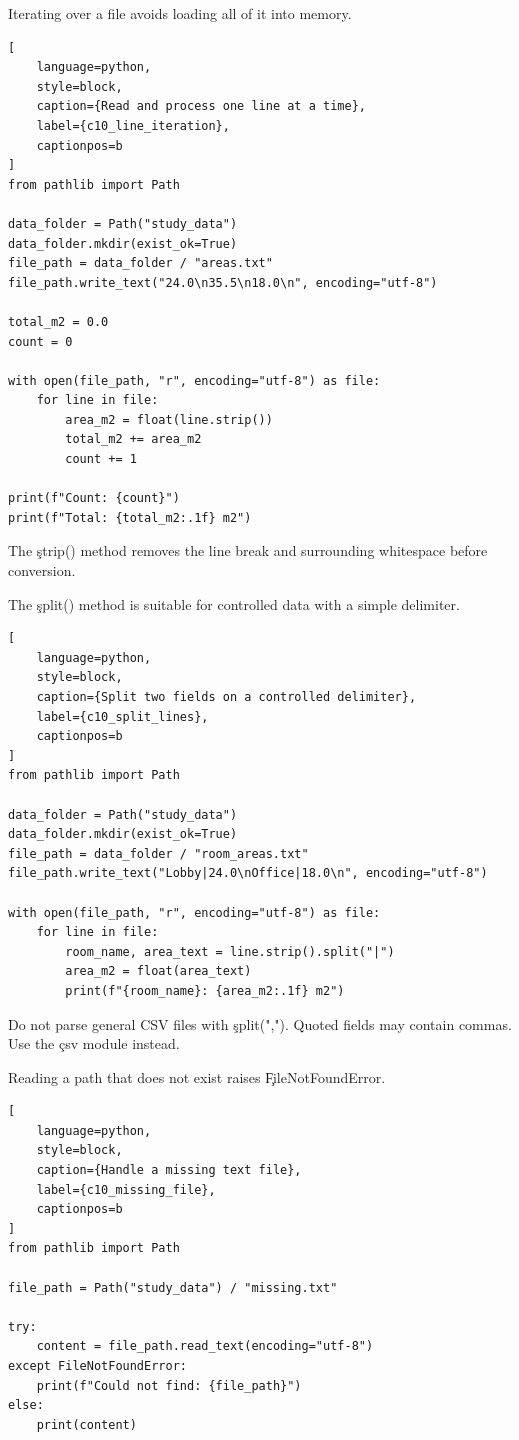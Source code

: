
Iterating over a file avoids loading all of it into memory.

\begin{lstlisting}[
    language=python,
    style=block,
    caption={Read and process one line at a time},
    label={c10_line_iteration},
    captionpos=b
]
from pathlib import Path

data_folder = Path("study_data")
data_folder.mkdir(exist_ok=True)
file_path = data_folder / "areas.txt"
file_path.write_text("24.0\n35.5\n18.0\n", encoding="utf-8")

total_m2 = 0.0
count = 0

with open(file_path, "r", encoding="utf-8") as file:
    for line in file:
        area_m2 = float(line.strip())
        total_m2 += area_m2
        count += 1

print(f"Count: {count}")
print(f"Total: {total_m2:.1f} m2")
\end{lstlisting}

The \c{strip()} method removes the line break and surrounding whitespace before
conversion.


The \c{split()} method is suitable for controlled data with a simple delimiter.

\begin{lstlisting}[
    language=python,
    style=block,
    caption={Split two fields on a controlled delimiter},
    label={c10_split_lines},
    captionpos=b
]
from pathlib import Path

data_folder = Path("study_data")
data_folder.mkdir(exist_ok=True)
file_path = data_folder / "room_areas.txt"
file_path.write_text("Lobby|24.0\nOffice|18.0\n", encoding="utf-8")

with open(file_path, "r", encoding="utf-8") as file:
    for line in file:
        room_name, area_text = line.strip().split("|")
        area_m2 = float(area_text)
        print(f"{room_name}: {area_m2:.1f} m2")
\end{lstlisting}

Do not parse general CSV files with \c{split(",")}. Quoted fields may contain
commas. Use the \c{csv} module instead.


Reading a path that does not exist raises \c{FileNotFoundError}.

\begin{lstlisting}[
    language=python,
    style=block,
    caption={Handle a missing text file},
    label={c10_missing_file},
    captionpos=b
]
from pathlib import Path

file_path = Path("study_data") / "missing.txt"

try:
    content = file_path.read_text(encoding="utf-8")
except FileNotFoundError:
    print(f"Could not find: {file_path}")
else:
    print(content)
\end{lstlisting}

